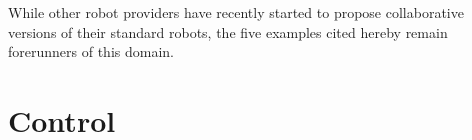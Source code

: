 While other robot providers have recently started to propose collaborative versions of their standard robots, the five examples cited hereby remain forerunners of this domain.
%
\section{Control}
%
%
%
%
%
